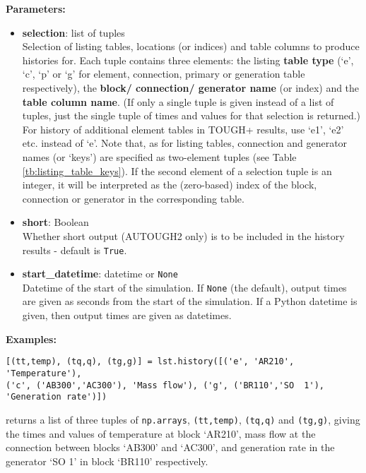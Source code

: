 \textbf{Parameters:}
\begin{itemize}

\item \textbf{selection}: list of tuples\\
  Selection of listing tables, locations (or indices) and table columns to produce histories for.  Each tuple contains three elements: the listing \textbf{table type} (`e', `c', `p' or `g' for element, connection, primary or generation table respectively), the \textbf{block/ connection/ generator name} (or index) and the \textbf{table column name}.  (If only a single tuple is given instead of a list of tuples, just the single tuple of times and values for that selection is returned.)  For history of additional element tables in TOUGH+ results, use `e1', `e2' etc. instead of `e'.  Note that, as for listing tables, connection and generator names (or `keys') are specified as two-element tuples (see Table \ref{tb:listing_table_keys}). If the second element of a selection tuple is an integer, it will be interpreted as the (zero-based) index of the block, connection or generator in the corresponding table.

\item \textbf{short}: Boolean\\
  Whether short output (AUTOUGH2 only) is to be included in the history results - default is \texttt{True}.

\item \textbf{start\_datetime}: datetime or \texttt{None}\\
  Datetime of the start of the simulation. If \texttt{None} (the default), output times are given as seconds from the start of the simulation. If a Python datetime is given, then output times are given as datetimes.

\end{itemize}

\textbf{Examples:}

\begin{lstlisting}
[(tt,temp), (tq,q), (tg,g)] = lst.history([('e', 'AR210', 'Temperature'),
('c', ('AB300','AC300'), 'Mass flow'), ('g', ('BR110','SO  1'), 'Generation rate')])
\end{lstlisting}

returns a list of three tuples of \texttt{np.arrays}, \texttt{(tt,temp)}, \texttt{(tq,q)} and \texttt{(tg,g)}, giving the times and values of temperature at block `AR210', mass flow at the connection between blocks `AB300' and `AC300', and generation rate in the generator `SO  1' in block `BR110' respectively.

